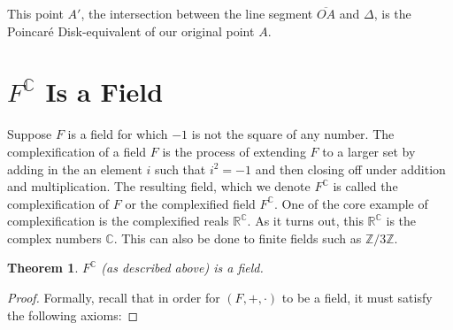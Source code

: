 \documentclass[12pt]{article}
\newcommand{\Z}{\mathbb{Z}}
\newcommand{\R}{\mathbb{R}}
\newcommand{\C}{\mathbb{C}}
\newcommand{\fc}{F^{\C}}
\newcommand{\poincare}{Poincar\'{e} }
\theoremstyle{plain}
\newtheorem{theorem}{Theorem}[section]
\theoremstyle{definition}
\begin{document}
\begin{appendices}
\begin{center}
\end{center}

This point $A'$, the intersection between the line segment $\overline{OA}$ and $\Delta$, is the \poincare Disk-equivalent of our original point $A$.

\newpage 
\section{$\fc$ Is a Field} \label{appendixB}

	Suppose $F$ is a field for which $-1$ is not the square of any number. The complexification of a field $F$ is the process of extending $F$ to a larger set by adding in the an element $i$ such that $i^2 = -1$ and then closing off under addition and multiplication. The resulting field, which we denote $F^\C$ is called the complexification of $F$ or the complexified field $F^\C$. One of the core example of complexification is the complexified reals $\R^\C$. As it turns out, this $\R^\C$ is the complex numbers $\C$. This can also be done to finite fields such as $\Z/3\Z$.

\begin{theorem} 
$\fc$ (as described above) is a field.
\end{theorem}

\begin{proof} Formally, recall that in order for $(F,+,\cdot)$ to be a field, it must satisfy the following axioms:


\end{proof}
\end{appendices}
\end{document}
